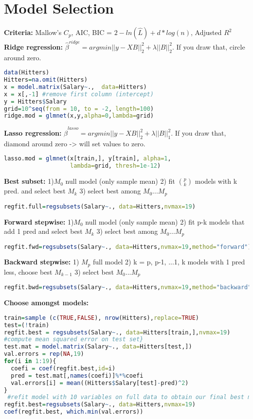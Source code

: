\section{Model Selection}
\textbf{Criteria: } Mallow's $C_p$, AIC, BIC = $2-ln(\hat L) + d*log(n)$, Adjusted $R^2$
\textbf{Ridge regression: } $\hat\beta^{ridge} = argmin ||y-XB||_2^2+ \lambda||B||_2^2$. If you draw that, circle around zero. 
\begin{lstlisting}[language=R]
data(Hitters)
Hitters=na.omit(Hitters)
x = model.matrix(Salary~.,  data=Hitters)
x = x[,-1] #remove first column (intercept)
y = Hitters$Salary
grid=10^seq(from = 10, to = -2, length=100)
ridge.mod = glmnet(x,y,alpha=0,lambda=grid)
\end{lstlisting}
\textbf{Lasso regression: }
$\hat\beta^{lasso} = argmin ||y-XB||_2^2+ \lambda||B||_1^2$. If you draw that, diamond around zero -> will set values to zero. 
\begin{lstlisting}[language=R]
lasso.mod = glmnet(x[train,], y[train], alpha=1, 
                   lambda=grid, thresh=1e-12)
\end{lstlisting}
\textbf{Best subset: }
1)$M_0$ null model (only sample mean)
2) fit $p \choose k$ models with k pred. and select best $M_k$
3) select best among $M_0 ... M_p$
\begin{lstlisting}[language=R]
regfit.full=regsubsets(Salary~., data=Hitters,nvmax=19)
\end{lstlisting}

\textbf{Forward stepwise: }
1)$M_0$ null model (only sample mean)
2) fit p-k models that add 1 pred and select best $M_k$
3) select best among $M_0 ... M_p$
\begin{lstlisting}[language=R]
regfit.fwd=regsubsets(Salary~., data=Hitters,nvmax=19,method="forward")
\end{lstlisting}
\textbf{Backward stepwise: }
1) $M_p$ full model
2) k = p, p-1, ...1,
k models with 1 pred less, choose best $M_{k-1}$
3) select best $M_0 ... M_p$
\begin{lstlisting}[language=R]
regfit.bwd=regsubsets(Salary~., data=Hitters,nvmax=19,method="backward")
\end{lstlisting}
\textbf{Choose amongst models: }
\begin{lstlisting}[language=R]
train=sample (c(TRUE,FALSE), nrow(Hitters),replace=TRUE)
test=(!train)
regfit.best = regsubsets(Salary~., data=Hitters[train,],nvmax=19)
#compute mean squared error on test set}
test.mat = model.matrix(Salary~., data=Hitters[test,])
val.errors = rep(NA,19)
for(i in 1:19){
  coefi = coef(regfit.best,id=i)
  pred = test.mat[,names(coefi)]%*%coefi
  val.errors[i] = mean((Hitters$Salary[test]-pred)^2)
}
 #refit model with 10 variables on full data to obtain our final best model
regfit.best=regsubsets(Salary~., data=Hitters,nvmax=19)
coef(regfit.best, which.min(val.errors))
\end{lstlisting}